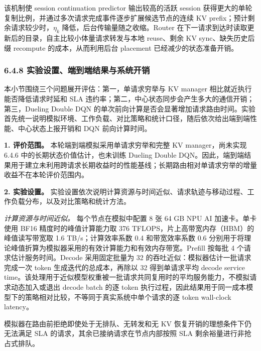 该机制使 session continuation predictor 输出较高的活跃 session 获得更大的单轮复制比例，并通过多次请求完成事件逐步扩展候选节点的连续 KV prefix；预计剩余请求较少时，\(\eta_k\) 降低，后台传输量随之收缩。Router 在下一请求到达时读取更新后的目录，自主比较小体量请求转发与本地 reuse、剩余 KV sync、缺失历史后缀 recompute 的成本，从而利用后台 placement 已经减少的状态准备开销。

\subsubsection*{6.4.8 实验设置、端到端结果与系统开销}

本小节围绕三个问题展开评估：第一，单请求穷举与 KV manager 相比就近执行能否降低请求时延和 SLA 违约率；第二，中心状态同步会产生多大的通信开销；第三，Dueling Double DQN 的单次前向计算是否会显著增加请求路由时间。实验首先统一说明模拟环境、工作负载、对比策略和统计口径，随后依次给出端到端性能、中心状态上报开销和 DQN 前向计算时间。

\medskip
\noindent\textbf{1. 评价范围。}
本轮端到端模拟采用单请求穷举和完整 KV manager，尚未实现 6.4.6 中的长期状态价值估计，也未训练 Dueling Double DQN。因此，端到端结果用于建立未利用跨请求长期收益时的性能基线；长期路由相对单请求穷举的增量收益不在本轮评价范围内。

\medskip
\noindent\textbf{2. 实验设置。}
实验设置依次说明计算资源与时间近似、请求轨迹与移动过程、工作负载分布，以及对比策略和统计方法。

\noindent\textit{计算资源与时间近似。}
每个节点在模拟中配置 8 张 64 GB NPU AI 加速卡。单卡使用 BF16 精度时的峰值计算能力取 376 TFLOPS，片上高带宽内存（HBM）的峰值读写带宽取 1.6 TB/s；计算效率系数 0.4 和带宽效率系数 0.6 分别用于将理论峰值折算为模拟器采用的有效计算能力和有效内存带宽。Prefill 按每批 4 个请求估计服务时间。Decode 采用固定批量为 32 的吞吐近似：模拟器估计一批请求完成一次 token 生成迭代的总成本，再除以 32 得到单请求平均 decode service time。该处理用于近似模型权重被一批请求共同复用时的平均服务能力，不模拟请求动态加入或退出 decode batch 的逐 token 执行过程，因此结果用于同一成本模型下的策略相对比较，不等同于真实系统中单个请求的逐 token wall-clock latency。

模拟器在路由前拒绝即使处于无排队、无转发和无 KV 恢复开销的理想条件下仍无法满足 SLA 的请求，其余已接纳请求在节点内部按照 SLA 剩余裕量进行非抢占式排队。

